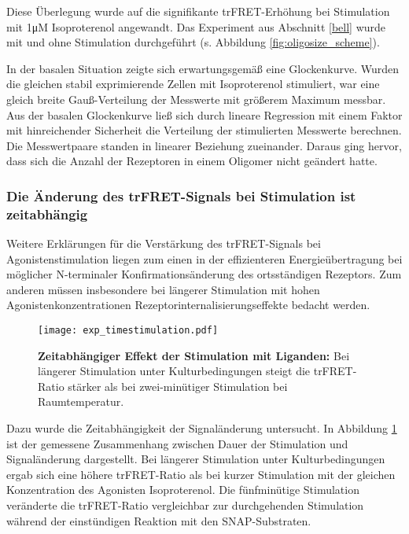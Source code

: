 Diese Überlegung wurde auf die signifikante trFRET-Erhöhung bei Stimulation mit 1\si{\micro M} Isoproterenol angewandt. Das Experiment aus Abschnitt \ref{bell} wurde mit und ohne Stimulation durchgeführt (s. Abbildung \ref{fig:oligosize_scheme}). 

In der basalen Situation zeigte sich erwartungsgemäß eine Glockenkurve. Wurden die gleichen stabil exprimierende Zellen mit Isoproterenol stimuliert, war eine gleich breite Gauß-Verteilung der Messwerte mit größerem Maximum messbar. Aus der basalen Glockenkurve ließ sich durch lineare Regression mit einem Faktor mit hinreichender Sicherheit die Verteilung der stimulierten Messwerte berechnen. Die Messwertpaare standen in linearer Beziehung zueinander. Daraus ging hervor, dass sich die Anzahl der Rezeptoren in einem Oligomer nicht geändert hatte.

\subsubsection{Die Änderung des trFRET-Signals bei Stimulation ist zeitabhängig} 
 
Weitere Erklärungen für die Verstärkung des trFRET-Signals bei Agonistenstimulation liegen zum einen in der effizienteren Energieübertragung bei möglicher N-terminaler Konfirmationsänderung des ortsständigen Rezeptors. Zum anderen müssen insbesondere bei längerer Stimulation mit hohen Agonistenkonzentrationen Rezeptorinternalisierungseffekte bedacht werden.

\begin{figure}[htbp]
	\centering
    \texttt{[image: exp\_timestimulation.pdf]}
    \caption{\textbf{Zeitabhängiger Effekt der Stimulation mit Liganden:} Bei längerer Stimulation unter Kulturbedingungen steigt die trFRET-Ratio stärker als bei zwei-minütiger Stimulation bei Raumtemperatur.} 
    \label{fig:timestimulation}
\end{figure}

Dazu wurde die Zeitabhängigkeit der Signaländerung untersucht. In Abbildung \ref{fig:timestimulation} ist der gemessene Zusammenhang zwischen Dauer der Stimulation und Signaländerung dargestellt. Bei längerer Stimulation unter Kulturbedingungen ergab sich eine höhere trFRET-Ratio als bei kurzer Stimulation mit der gleichen Konzentration des Agonisten Isoproterenol. Die fünfminütige Stimulation veränderte die trFRET-Ratio vergleichbar zur durchgehenden Stimulation während der einstündigen Reaktion mit den SNAP-Substraten.
 
